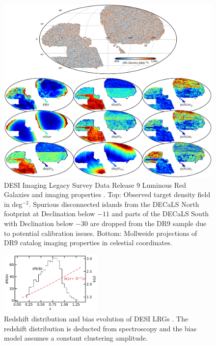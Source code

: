 \begin{figure}
    \centering
    \includegraphics[width=\textwidth]{figures/dr9data.pdf}
    \caption{DESI Imaging Legacy Survey Data Release 9 Luminous Red Galaxies and imaging properties \citep{dey2018overview}. Top: Observed target density field in deg$^{-2}$. Spurious disconnected islands from the DECaLS North footprint at Declination below $-11$ and parts of the DECaLS South with Declination below $-30$ are dropped from the DR9 sample due to potential calibration issues. Bottom: Mollweide projections of DR9 catalog imaging properties in celestial coordinates.}
    \label{fig:ng}
\end{figure}
%

\begin{figure}
    \centering
    \includegraphics[width=0.45\textwidth]{figures/nz_lrg.pdf}
    \caption{Redshift distribution and bias evolution of DESI LRGs \citep{zhou2021clustering, zhou2022target}. The redshift distribution is deducted from spectroscopy and the bias model assumes a constant clustering amplitude.}
    \label{fig:nz}
\end{figure}


